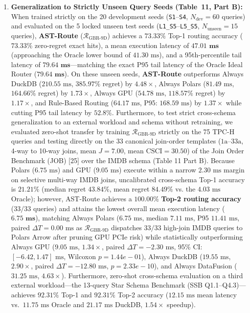 \documentclass[10pt,a4paper]{article}
\begin{document}
\begin{enumerate}[leftmargin=1.5em,itemsep=2pt]
    \item \textbf{Generalization to Strictly Unseen Query Seeds (Table~11, Part B):} When trained strictly on the 20 development seeds (\texttt{S1}--\texttt{S4}, $N_{\text{dev}}=60$ queries) and evaluated on the 5 locked unseen test seeds (\texttt{L1\_S5}--\texttt{L5\_S5}, $N_{\text{unseen}}=15$ queries), \textbf{AST-Route} ($\mathcal{R}_{\text{GBR-9D}}$) achieves a $\mathbf{73.33\%}$ Top-1 routing accuracy ($\mathbf{73.33\%}$ zero-regret exact hits), a mean execution latency of $\mathbf{47.01\text{ ms}}$ (approaching the Oracle lower bound of $41.30\text{ ms}$), and a 95th-percentile tail latency of $\mathbf{79.64\text{ ms}}$---matching the exact P95 tail latency of the Oracle Ideal Router ($\mathbf{79.64\text{ ms}}$). On these unseen seeds, \textbf{AST-Route} outperforms Always DuckDB ($210.55\text{ ms}$, $385.97\%$ regret) by $\mathbf{4.48\times}$, Always Polars ($81.49\text{ ms}$, $164.66\%$ regret) by $\mathbf{1.73\times}$, Always GPU ($54.78\text{ ms}$, $118.57\%$ regret) by $\mathbf{1.17\times}$, and Rule-Based Routing ($64.17\text{ ms}$, P95: $168.59\text{ ms}$) by $\mathbf{1.37\times}$ while cutting P95 tail latency by $\mathbf{52.8\%}$. Furthermore, to test strict cross-schema generalization to an external workload and schema without retraining, we evaluated zero-shot transfer by training $\mathcal{R}_{\text{GBR-9D}}$ strictly on the 75 TPC-H queries and testing directly on the 33 canonical join-order templates ($1\text{a}$--$33\text{a}$, 4-way to 10-way joins, mean $J=7.00$, mean $\text{CSCI}=30.50$) of the Join Order Benchmark (JOB) [25] over the IMDB schema (Table 11 Part B). Because Polars ($6.75\text{ ms}$) and GPU ($9.05\text{ ms}$) execute within a narrow $2.30\text{ ms}$ margin on selective multi-way IMDB joins, uncalibrated cross-schema Top-1 accuracy is $21.21\%$ (median regret $43.84\%$, mean regret $84.49\%$ vs. the $4.03\text{ ms}$ Oracle); however, AST-Route achieves a $\mathbf{100.00\%}$ \textbf{Top-2 routing accuracy} ($33/33$ queries) and attains the lowest overall mean execution latency ($\mathbf{6.75\text{ ms}}$), matching Always Polars ($6.75\text{ ms}$, median $7.11\text{ ms}$, P95 $11.41\text{ ms}$, paired $\Delta T = 0.00\text{ ms}$ as $\mathcal{R}_{\text{GBR-9D}}$ dispatches $33/33$ high-join IMDB queries to Polars Arrow after pruning GPU PCIe risk) while statistically outperforming Always GPU ($9.05\text{ ms}$, $1.34\times$, paired $\Delta T = -2.30\text{ ms}$, 95\% CI: $[-6.42, 1.47]\text{ ms}$, Wilcoxon $p = 1.44e-01$), Always DuckDB ($19.55\text{ ms}$, $2.90\times$, paired $\Delta T = -12.80\text{ ms}$, $p = 2.33e-10$), and Always DataFusion ($31.25\text{ ms}$, $4.63\times$). Furthermore, zero-shot cross-schema evaluation on a third external workload---the 13-query Star Schema Benchmark (SSB Q1.1--Q4.3)---achieves $92.31\%$ Top-1 and $92.31\%$ Top-2 accuracy ($12.15\text{ ms}$ mean latency vs.\ $11.75\text{ ms}$ Oracle and $21.17\text{ ms}$ DuckDB, $1.54\times$ speedup).

\end{enumerate}
\end{document}
